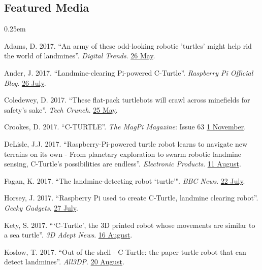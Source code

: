 \documentclass[12pt,a4paper]{article}
\begin{document}
	\subsection*{Featured Media}
		\begin{description}
			\itemsep0.25em
			\item Adams, D. 2017. ``An army of these odd-looking robotic 'turtles' might help rid the world of landmines''. \textit{Digital Trends}. \href{https://www.digitaltrends.com/cool-tech/robot-turtles-detect-landmines/}{26 May}.
			\item Ander, J. 2017. ``Landmine-clearing Pi-powered C-Turtle''. \textit{Raspberry Pi Official Blog}. \href{https://www.raspberrypi.org/blog/landmine-c-turtle/}{26 July}.
			\item Coledewey, D. 2017. ``These flat-pack turtlebots will crawl across minefields for safety's sake''. \textit{Tech Crunch}. \href{https://techcrunch.com/2017/05/25/these-flat-pack-turtlebots-will-crawl-across-minefields-for-safetys-sake/}{25 May}.
			\item Crookes, D. 2017. ``C-TURTLE''. \textit{The MagPi Magazine}: Issue 63 \href{https://www.raspberrypi.org/magpi/c-turtle/}{1 November}.
			\item DeLisle, J.J. 2017. ``Raspberry-Pi-powered turtle robot learns to navigate new terrains on its own - From planetary exploration to swarm robotic landmine sensing, C-Turtle's possibilities are endless''. \textit{Electronic Products}. \href{https://www.electronicproducts.com/Robotics/AI/Raspberry_Pi_powered_turtle_robot_learns_to_navigate_new_terrains_on_its_own.aspx}{11 August}.
			\item Fagan, K. 2017. ``The landmine-detecting robot `turtle'". \textit{BBC News}. \href{http://www.bbc.com/news/av/technology-40296297/the-soft-3d-printed-robot-that-could-come-to-the-rescue}{22 July}.
			\item Horsey, J. 2017. ``Raspberry Pi used to create C-Turtle, landmine clearing robot''. \textit{Geeky Gadgets}. \href{https://www.geeky-gadgets.com/landmine-clearing-robot-27-07-2017/}{27 July}.
			\item Kety, S. 2017. ```C-Turtle', the 3D printed robot whose movements are similar to a sea turtle''. \textit{3D Adept News}. \href{https://3dadept.com/c-turtle-the-3d-printed-robot-whose-movements-are-similar-to-a-sea-turtle/}{16 August}.
			\item Koslow, T. 2017. ``Out of the shell - C-Turtle: the paper turtle robot that can detect landmines''. \textit{All3DP}. \href{https://all3dp.com/landmine-detecting-robot-c-turtle/}{20 August}.

\end{description}
\end{document}
